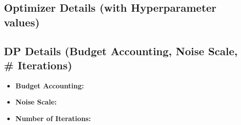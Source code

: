 \subsection{Optimizer Details (with Hyperparameter values)}\label{subsec:optimizer-details}

\subsection{DP Details (Budget Accounting, Noise Scale, # Iterations)}\label{subsec:dp-details}
\begin{itemize}
    \item \textbf{Budget Accounting:} 
    \item \textbf{Noise Scale:}
    \item \textbf{Number of Iterations:}
\end{itemize}